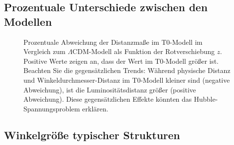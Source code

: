 \documentclass[a4paper,12pt]{article}
\theoremstyle{definition}
\theoremstyle{remark}
\begin{document}
	\subsection{Prozentuale Unterschiede zwischen den Modellen}
	
	\begin{figure}[H]
		\centering
		\caption{Prozentuale Abweichung der Distanzmaße im T0-Modell im Vergleich zum \(\Lambda\)CDM-Modell als Funktion der Rotverschiebung $z$. Positive Werte zeigen an, dass der Wert im T0-Modell größer ist. Beachten Sie die gegensätzlichen Trends: Während physische Distanz und Winkeldurchmesser-Distanz im T0-Modell kleiner sind (negative Abweichung), ist die Luminositätsdistanz größer (positive Abweichung). Diese gegensätzlichen Effekte könnten das Hubble-Spannungsproblem erklären.}
		\label{fig:prozentuale_abweichungen}
	\end{figure}
	
	\subsection{Winkelgröße typischer Strukturen}
	
\end{document}
